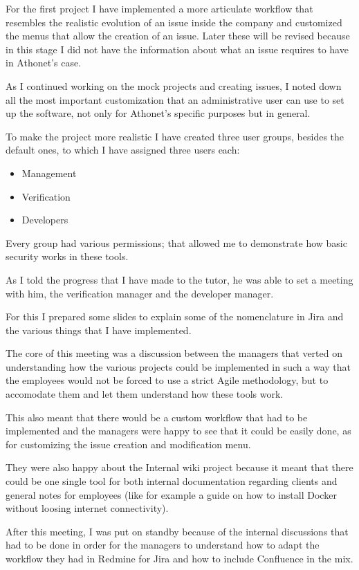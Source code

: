 	For the first project I have implemented a more articulate workflow that resembles the realistic evolution of an issue inside the company and customized the menus that allow the creation of an issue.
	Later these will be revised because in this stage I did not have the information about what an issue requires to have in Athonet's case. 
	
	As I continued working on the mock projects and creating issues, I noted down all the most important customization that an administrative user can use to set up the software, not only for Athonet's specific purposes but in general.
	
	To make the project more realistic I have created three user groups, besides the default ones, to which I have assigned three users each:
	\begin{itemize}
		\item Management
		\item Verification
		\item Developers
	\end{itemize}
	
	Every group had various permissions; that allowed me to demonstrate how basic security works in these tools.
	
	As I told the progress that I have made to the tutor, he was able to set a meeting with him, the verification manager and the developer manager.
	
	For this I prepared some slides to explain some of the nomenclature in Jira and the various things that I have implemented.
	
	The core of this meeting was a discussion between the managers that verted on understanding how the various projects could be implemented in such a way that the employees would not be forced to use a strict Agile methodology, but to accomodate them and let them understand how these tools work.
	
	This also meant that there would be a custom workflow that had to be implemented and the managers were happy to see that it could be easily done, as for customizing the issue creation and modification menu.
	
	
	They were also happy about the Internal wiki project because it meant that there could be one single tool for both internal documentation regarding clients and general notes for employees (like for example a guide on how to install Docker without loosing internet connectivity).
	
	After this meeting, I was put on standby because of the internal discussions that had to be done in order for the managers to understand how to adapt the workflow they had in Redmine for Jira and how to include Confluence in the mix.
	
